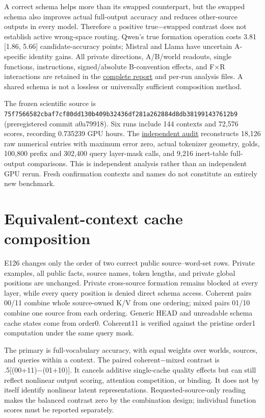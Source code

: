 \documentclass[11pt]{article}
\begin{document}
A correct schema helps more than its swapped counterpart, but the swapped schema also improves actual full-output accuracy and reduces other-source outputs in every model. Therefore a positive true−swapped contrast does not establish active wrong-space routing. Qwen's true formation operation costs 3.81 {[}1.86, 5.66{]} candidate-accuracy points; Mistral and Llama have uncertain A-specific identity gains. All private directions, A/B/world readouts, single functions, instructions, signed/absolute B-convention effects, and F×R interactions are retained in the \href{results/e125/report.md}{complete report} and per-run analysis files. A shared schema is not a lossless or universally sufficient composition method.

The frozen scientific source is \texttt{75f75665\allowbreak{}82cbaf7c\allowbreak{}f80dd130\allowbreak{}b409b324\allowbreak{}36df281a\allowbreak{}262884d8\allowbreak{}db381991\allowbreak{}437612b9} (preregistered commit a0a79918). Six runs include 144 contexts and 72,576 scores, recording 0.735239 GPU hours. The \href{results/e125/independent_review_2026-10-12.md}{independent audit} reconstructs 18,126 raw numerical entries with maximum error zero, actual tokenizer geometry, golds, 100,800 prefix and 302,400 query layer-mask calls, and 9,216 inert-table full-output comparisons. This is independent analysis rather than an independent GPU rerun. Fresh confirmation contexts and names do not constitute an entirely new benchmark.

\section{Equivalent-context cache composition}\label{equivalent-context-cache-composition}

E126 changes only the order of two correct public source--word-set rows. Private examples, all public facts, source names, token lengths, and private global positions are unchanged. Private cross-source formation remains blocked at every layer, while every query position is denied direct schema access. Coherent pairs 00/11 combine whole source-owned K/V from one ordering; mixed pairs 01/10 combine one source from each ordering. Generic HEAD and unreadable schema cache states come from order0. Coherent11 is verified against the pristine order1 computation under the same query mask.

The primary is full-vocabulary accuracy, with equal weights over worlds, sources, and queries within a context. The paired coherent−mixed contrast is .5{[}(00+11)−(01+10){]}. It cancels additive single-cache quality effects but can still reflect nonlinear output scoring, attention competition, or binding. It does not by itself identify nonlinear latent representations. Requested-source-only reading makes the balanced contrast zero by the combination design; individual function scores must be reported separately.
\end{document}
